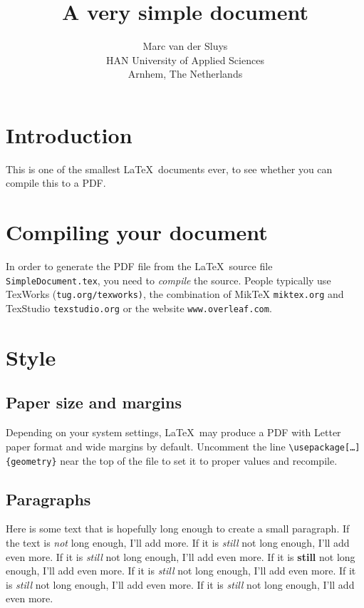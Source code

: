 \documentclass[11pt]{article}
\title{A very simple document}
\author{Marc van der Sluys\\
HAN University of Applied Sciences\\
Arnhem, The Netherlands}
\begin{document}
\maketitle

\tableofcontents


\section{Introduction}

This is one of the smallest \LaTeX\ documents ever, to see whether you can compile this to a PDF.  

\section{Compiling your document}

In order to generate the PDF file from the \LaTeX\ source file \texttt{SimpleDocument.tex}, you need to
\emph{compile} the source.  People typically use TexWorks (\texttt{tug.org/texworks)}, the combination of
MikTeX \texttt{miktex.org} and TexStudio \texttt{texstudio.org} or the website \texttt{www.overleaf.com}.

\section{Style}

\subsection{Paper size and margins}

Depending on your system settings, \LaTeX\ may produce a PDF with Letter paper format and wide margins by
default.  Uncomment the line \linebreak
\texttt{\textbackslash{}usepackage[\ldots]\{geometry\}} \linebreak
near the top of the file to set it to proper values and recompile.


\subsection{Paragraphs}

Here is some text that is hopefully long enough to create a small paragraph.  If the text is \emph{not} long
enough, I'll add more.
If it is \emph{still} not long enough, I'll add even more.
If it is \emph{still} not long enough, I'll add even more.
If it is \textbf{still} not long enough, I'll add even more.
If it is \emph{still} not long enough, I'll add even more.
If it is \emph{still} not long enough, I'll add even more.
If it is \emph{still} not long enough, I'll add even more.
\end{document}
